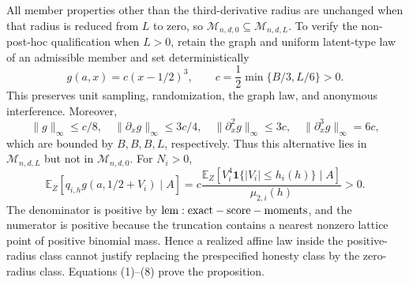 All member properties other than the third-derivative radius are unchanged when that radius is reduced from \(L\) to zero, so \(\mathcal M_{n,d,0}\subseteq\mathcal M_{n,d,L}\).  To verify the non-post-hoc qualification when \(L>0\), retain the graph and uniform latent-type law of an admissible member and set deterministically
\[
 g(a,x)=c(x-1/2)^3,
 \qquad c=\frac12\min\{B/3,L/6\}>0.
\tag{7}
\]
This preserves unit sampling, randomization, the graph law, and anonymous interference.  Moreover,
\[
 \|g\|_\infty\leq c/8,\quad
 \|\partial_xg\|_\infty\leq3c/4,\quad
 \|\partial_x^2g\|_\infty\leq3c,\quad
 \|\partial_x^3g\|_\infty=6c,
\]
which are bounded by \(B,B,B,L\), respectively.  Thus this alternative lies in \(\mathcal M_{n,d,L}\) but not in \(\mathcal M_{n,d,0}\).  For \(N_i>0\),
\[
 \mathbb E_Z[q_{i,h}g(a,1/2+V_i)\mid A]
 =c\frac{\mathbb E_Z[V_i^4\mathbf1\{|V_i|\leq h_i(h)\}\mid A]}{\mu_{2,i}(h)}>0.
\tag{8}
\]
The denominator is positive by \({\rm lem:exact-score-moments}\), and the numerator is positive because the truncation contains a nearest nonzero lattice point of positive binomial mass.  Hence a realized affine law inside the positive-radius class cannot justify replacing the prespecified honesty class by the zero-radius class.  Equations (1)--(8) prove the proposition.